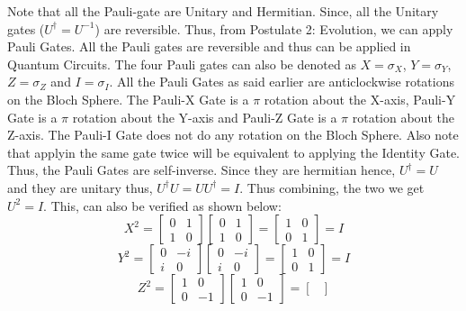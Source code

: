 \documentclass[12pt, oneside]{book}
\theoremstyle{definition}
\theoremstyle{definition}
\theoremstyle{remark}
\begin{document}
\begin{importantnote}
Note that all the Pauli-gate are Unitary and Hermitian. Since, all the Unitary gates ($U^{\dagger}=U^{-1}$)
are reversible. Thus, from Postulate 2: Evolution, we can apply Pauli Gates. All the Pauli gates are reversible 
and thus can be applied in Quantum Circuits. The four Pauli gates can also be denoted as $X=\sigma_X$, $Y=\sigma_Y$, $Z=\sigma_Z$ and $I=\sigma_I$.
All the Pauli Gates as said earlier are anticlockwise rotations on the Bloch Sphere. The Pauli-X Gate is a $\pi$ rotation about the X-axis,
Pauli-Y Gate is a $\pi$ rotation about the Y-axis and Pauli-Z Gate is a $\pi$ rotation about the Z-axis. The Pauli-I Gate does not do any rotation on the Bloch Sphere.
Also note that applyin the same gate twice will be equivalent to applying the Identity Gate. Thus, the Pauli Gates are self-inverse. Since they are hermitian hence, $U^{\dagger}=U$ and 
they are unitary thus, $U^{\dagger}U=UU^{\dagger}=I$. Thus combining, the two we get $U^2=I$.
This, can also be verified as shown below:
\[
    X^2=\begin{bmatrix}
        0 & 1 \\
        1 & 0
    \end{bmatrix}\begin{bmatrix}
        0 & 1 \\
        1 & 0
    \end{bmatrix}=\begin{bmatrix}
        1 & 0 \\
        0 & 1
    \end{bmatrix}=I
\]
\[
    Y^2=\begin{bmatrix}
        0 & -i \\
        i & 0
    \end{bmatrix}\begin{bmatrix}
        0 & -i \\
        i & 0
    \end{bmatrix}=\begin{bmatrix}
        1 & 0 \\
        0 & 1
    \end{bmatrix}=I
\]
\[
    Z^2=\begin{bmatrix}
        1 & 0 \\
        0 & -1
    \end{bmatrix}\begin{bmatrix}
        1 & 0 \\
        0 & -1
    \end{bmatrix}=\begin{bmatrix}

\end{bmatrix}\]
\end{importantnote}
\end{document}
